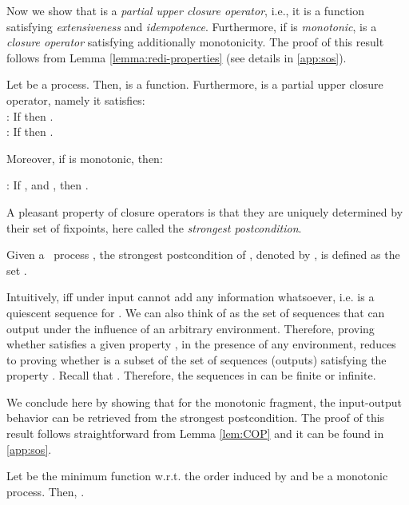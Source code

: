 \documentclass{tlp}
\begin{document}
Now we  show that   is a \emph{partial upper closure operator}, i.e., it is a function satisfying  \emph{extensiveness} and  \emph{idempotence}. Furthermore, if  is \emph{monotonic},   is a \emph{closure operator} satisfying additionally monotonicity. The proof of this result follows from   Lemma \ref{lemma:redi-properties} (see details in \ref{app:sos}). 


\begin{lemma}\label{lem:COP}
Let  be a process. Then,  is a function. Furthermore,   is a  partial  upper  closure operator,  namely it satisfies:
\\ : If   then .\\
: If   then .

Moreover, if  is monotonic, then:

: If  ,    and  , then  .

\end{lemma}

A pleasant property of closure operators is that they are uniquely determined by their set of fixpoints, here called the \emph{strongest postcondition}.
\begin{definition}\label{def:sp}
Given a \utcc\ process , the strongest postcondition of ,
denoted by , is defined as the set .
\end{definition}

Intuitively,    iff  under input  cannot 
add any information whatsoever, i.e.    is a quiescent sequence for .  We can also think of    as the set of sequences that  can output under the influence of an arbitrary environment. 
Therefore, proving whether  satisfies a given  property ,  in the presence of any environment, reduces to proving whether   is a subset of the set of sequences (outputs) satisfying the property . Recall that . Therefore, the sequences in  can be finite or infinite. 

We conclude here by showing that for the    monotonic fragment,   the input-output behavior can be retrieved 
from  the strongest postcondition. The proof of this result follows  straightforward from Lemma \ref{lem:COP} 
and it can be found in \ref{app:sos}. 


\begin{theorem}\label{the:col:CO}
Let  be the minimum function w.r.t. the order induced by  and   be a monotonic process. Then, 
.
\end{theorem}
\end{document}
